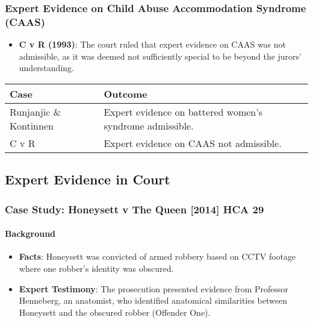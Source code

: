 \subsubsection{Expert Evidence on Child Abuse Accommodation Syndrome
(CAAS)}\label{expert-evidence-on-child-abuse-accommodation-syndrome-caas}

\begin{itemize}
\tightlist
\item
  \textbf{C v R (1993)}: The court ruled that expert evidence on CAAS
  was not admissible, as it was deemed not sufficiently special to be
  beyond the jurors' understanding.
\end{itemize}

\begin{longtable}[]{@{}
  >{\raggedright\arraybackslash}p{}
  >{\raggedright\arraybackslash}p{}@{}}
\toprule\noalign{}
\begin{minipage}[b]{\linewidth}\raggedright
Case
\end{minipage} & \begin{minipage}[b]{\linewidth}\raggedright
Outcome
\end{minipage} \\
\midrule\noalign{}
\endhead
\bottomrule\noalign{}
\endlastfoot
Runjanjic \& Kontinnen & Expert evidence on battered women's syndrome
admissible. \\
C v R & Expert evidence on CAAS not admissible. \\
\end{longtable}

\subsection{  Expert Evidence in Court}\label{expert-evidence-in-court}

\subsubsection{Case Study: Honeysett v The Queen {[}2014{]} HCA
29}\label{case-study-honeysett-v-the-queen-2014-hca-29}

\paragraph{Background}\label{background}

\begin{itemize}
\tightlist
\item
  \textbf{Facts}: Honeysett was convicted of armed robbery based on CCTV
  footage where one robber's identity was obscured.
\item
  \textbf{Expert Testimony}: The prosecution presented evidence from
  Professor Henneberg, an anatomist, who identified anatomical
  similarities between Honeysett and the obscured robber (Offender One).
\end{itemize}

